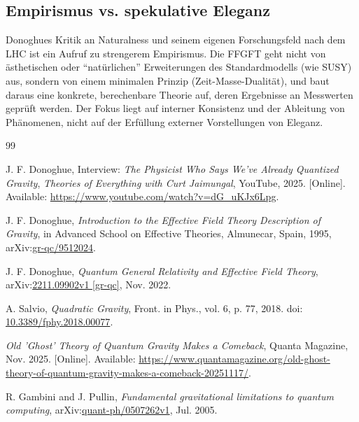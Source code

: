 	\subsection{Empirismus vs. spekulative Eleganz}
	Donoghues Kritik an Naturalness und seinem eigenen Forschungsfeld nach dem LHC ist ein Aufruf zu strengerem Empirismus. Die FFGFT geht nicht von ästhetischen oder ``natürlichen'' Erweiterungen des Standardmodells (wie SUSY) aus, sondern von einem minimalen Prinzip (Zeit-Masse-Dualität), und baut daraus eine konkrete, berechenbare Theorie auf, deren Ergebnisse an Messwerten geprüft werden. Der Fokus liegt auf interner Konsistenz und der Ableitung von Phänomenen, nicht auf der Erfüllung externer Vorstellungen von Eleganz.
		\begin{thebibliography}{99}
		
		J. F. Donoghue,
		Interview: \emph{The Physicist Who Says We've Already Quantized Gravity},
		\textit{Theories of Everything with Curt Jaimungal}, YouTube, 2025.
		[Online]. Available: \href{https://www.youtube.com/watch?v=dG_uKJx6Lpg}{https://www.youtube.com/watch?v=dG\_uKJx6Lpg}.
		
		J. F. Donoghue,
		\emph{Introduction to the Effective Field Theory Description of Gravity},
		in Advanced School on Effective Theories, Almunecar, Spain, 1995,
		arXiv:\href{https://arxiv.org/abs/gr-qc/9512024}{gr-qc/9512024}.
		
		J. F. Donoghue,
		\emph{Quantum General Relativity and Effective Field Theory},
		arXiv:\href{https://arxiv.org/abs/2211.09902}{2211.09902v1 [gr-qc]}, Nov. 2022.
		
		A. Salvio,
		\emph{Quadratic Gravity},
		Front. in Phys., vol. 6, p. 77, 2018.
		doi: \href{https://doi.org/10.3389/fphy.2018.00077}{10.3389/fphy.2018.00077}.
		
		\emph{Old 'Ghost' Theory of Quantum Gravity Makes a Comeback},
		Quanta Magazine, Nov. 2025.
		[Online]. Available: \href{https://www.quantamagazine.org/old-ghost-theory-of-quantum-gravity-makes-a-comeback-20251117/}{https://www.quantamagazine.org/old-ghost-theory-of-quantum-gravity-makes-a-comeback-20251117/}.
		
		R. Gambini and J. Pullin,
		\emph{Fundamental gravitational limitations to quantum computing},
		arXiv:\href{https://arxiv.org/abs/quant-ph/0507262}{quant-ph/0507262v1}, Jul. 2005.
		

\end{thebibliography}
